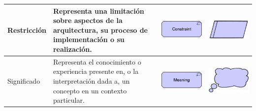 \begin{longtable}{|p{0.15\linewidth}|p{0.45\linewidth}|p{0.2\linewidth} p{0.2\linewidth}|}
    Restricción &
    Representa una limitación sobre aspectos de la arquitectura, su proceso de implementación o su realización. &
\begin{center}
    \includegraphics[width=1\linewidth]{imgs/capa_motivacional/constraint1.pdf}
\end{center} &
\begin{center}
    \includegraphics[width=0.5\linewidth]{imgs/capa_motivacional/constraint2.pdf}
\end{center}
    \\ \hline

    Significado &
    Representa el conocimiento o experiencia presente en, o la interpretación dada a, un concepto en un contexto particular. &
\begin{center}
    \includegraphics[width=1\linewidth]{imgs/capa_motivacional/meaning1.pdf}
\end{center} &
\begin{center}
    \includegraphics[width=0.5\linewidth]{imgs/capa_motivacional/meaning2.pdf}
\end{center}
    \\ \hline


\end{longtable}

